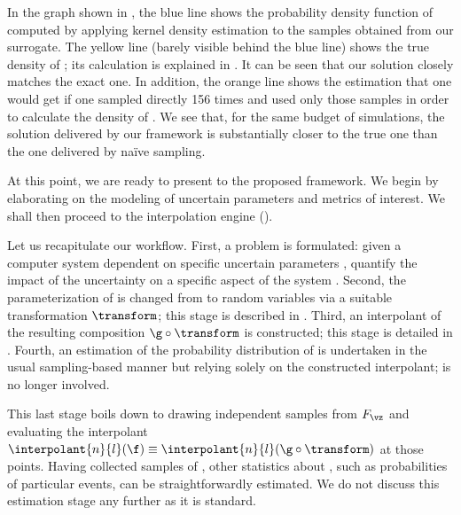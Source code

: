 In the graph shown in , the blue line shows the
probability density function of \g computed by applying kernel density
estimation to the samples obtained from our surrogate. The yellow line (barely
visible behind the blue line) shows the true density of \g; its calculation is
explained in . It can be seen that our solution closely
matches the exact one. In addition, the orange line shows the estimation that
one would get if one sampled \g directly 156 times and used only those samples
in order to calculate the density of \g. We see that, for the same budget of
simulations, the solution delivered by our framework is substantially closer to
the true one than the one delivered by na\"{i}ve sampling.

At this point, we are ready to present to the proposed framework. We begin by
elaborating on the modeling of uncertain parameters and metrics of interest. We
shall then proceed to the interpolation engine ().

Let us recapitulate our workflow. First, a problem is formulated: given a
computer system dependent on specific uncertain parameters \vu, quantify the
impact of the uncertainty on a specific aspect of the system \g. Second, the
parameterization of \g is changed from \vu to random variables \vz via a
suitable transformation $\transform$; this stage is described in
. Third, an interpolant of the resulting
composition $\g \circ \transform$ is constructed; this stage is detailed in
. Fourth, an estimation of the probability
distribution of \g is undertaken in the usual sampling-based manner but relying
solely on the constructed interpolant; \g is no longer involved.

This last stage boils down to drawing independent samples from $F_{\vz}$ and
evaluating the interpolant $\interpolant{n}{l}(\f) \equiv \interpolant{n}{l}(\g
\circ \transform)$ at those points. Having collected samples of \g, other
statistics about \g, such as probabilities of particular events, can be
straightforwardly estimated. We do not discuss this estimation stage any further
as it is standard.
